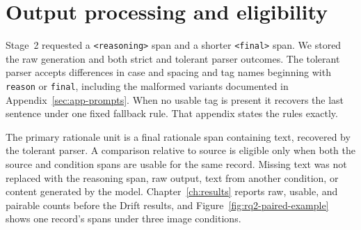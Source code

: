 \section{Output processing and eligibility}
\label{sec:setup-output-processing}

Stage~2 requested a \texttt{<reasoning>} span and a shorter \texttt{<final>}
span. We stored the raw generation and both strict and tolerant parser outcomes.
The tolerant parser accepts differences in case and spacing and tag names beginning
with \texttt{reason} or \texttt{final}, including the malformed variants documented
in Appendix~\ref{sec:app-prompts}. When no usable tag is present it recovers the
last sentence under one fixed fallback rule. That appendix states the rules exactly.

The primary rationale unit is a final rationale span containing text, recovered by
the tolerant parser. A comparison relative to source is eligible only when both the
source and condition spans are usable for the same record. Missing text was not
replaced with the reasoning span, raw output, text from another condition, or
content generated by the model. Chapter~\ref{ch:results} reports raw, usable, and
pairable counts before the Drift results, and
Figure~\ref{fig:rq2-paired-example} shows one record's spans under three image
conditions.
